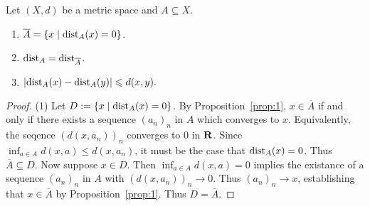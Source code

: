     \begin{proposition}
        Let $(X,d)$ be a metric space and $A \subseteq X$.
        \begin{enumerate}[label = (\arabic*),itemsep=1pt,topsep=3pt]
            \item $\overline{A} = \{x \mid \operatorname{dist}_A(x) = 0 \}$.
            \item $\operatorname{dist}_A = \operatorname{dist}_{\overline{A}}$.
            \item $\left| \operatorname{dist}_A(x) - \operatorname{dist}_A(y) \right| \leqslant d(x,y).$
        \end{enumerate}
    \end{proposition}
        \begin{proof}
            (1) Let $D:=\{x \mid \operatorname{dist}_A(x) = 0\}$. By Proposition~\ref{prop:1}, $x \in \overline{A}$ if and only if there exists a sequence $(a_n)_n$ in $A$ which converges to $x$. Equivalently, the seqence $(d(x,a_n))_n$ converges to $0$ in $\mathbf{R}$. Since $\inf_{a \in A}d(x,a) \leq d(x,a_n)$, it must be the case that $\operatorname{dist}_A(x) = 0$. Thus $\overline{A} \subseteq D$. Now suppose $x \in D$. Then $\inf_{a \in A}d(x,a) = 0$ implies the existance of a sequence $(a_n)_n$ in $A$ with $(d(x,a_n))_n \rightarrow 0$. Thus $(a_n)_n \rightarrow x$, establishing that $x \in \overline{A}$ by Proposition~\ref{prop:1}. Thus $D = \overline{A}$.


\end{proof}
